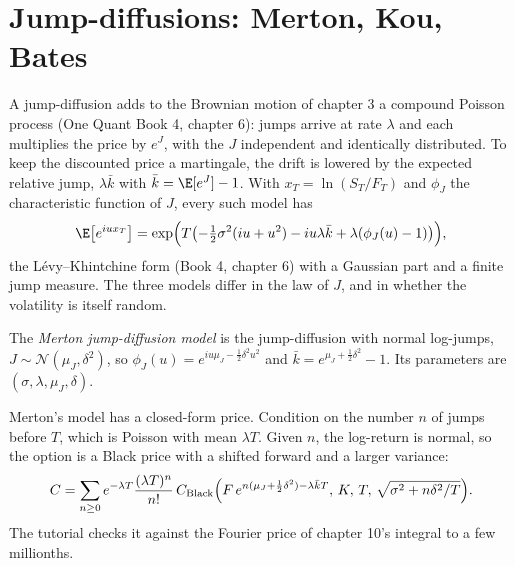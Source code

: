 \begin{omfigure}
\label{fig:dv:jumps-and-levy-models:short}
\end{omfigure}

\section{Jump-diffusions: Merton, Kou, Bates}

A jump-diffusion adds to the Brownian motion of chapter 3 a compound Poisson process (One Quant Book 4,
chapter 6): jumps arrive at rate $\lambda$ and each multiplies the price by $e^{J}$, with the $J$ independent
and identically distributed. To keep the discounted price a martingale, the drift is lowered by the expected
relative jump, $\lambda\bar k$ with $\bar k=\E[e^J]-1$. With $x_T=\ln(S_T/F_T)$ and $\phi_J$ the
characteristic function of $J$, every such model has
\[
\E\bigl[e^{iux_T}\bigr]=\exp\Bigl(T\bigl(-\tfrac12\sigma^2(iu+u^2)-iu\lambda\bar k+\lambda(\phi_J(u)-1)\bigr)\Bigr),
\]
the Lévy--Khintchine form (Book 4, chapter 6) with a Gaussian part and a finite jump measure. The three
models differ in the law of $J$, and in whether the volatility is itself random.

\begin{definition}\label{def:dv:jumps-and-levy-models:merton}
The \emph{Merton jump-diffusion model} is the jump-diffusion with normal
log-jumps, $J\sim\mathcal N(\mu_J,\delta^2)$, so $\phi_J(u)=e^{iu\mu_J-\frac12\delta^2u^2}$ and
$\bar k=e^{\mu_J+\frac12\delta^2}-1$. Its parameters are $(\sigma,\lambda,\mu_J,\delta)$.
\end{definition}

Merton's model has a closed-form price. Condition on the number $n$ of jumps before $T$, which is Poisson with
mean $\lambda T$. Given $n$, the log-return is normal, so the option is a Black price with a shifted forward and
a larger variance:
\[
C=\sum_{n\ge0}e^{-\lambda T}\frac{(\lambda T)^n}{n!}\,C_{\mathrm{Black}}\Bigl(F\,e^{n(\mu_J+\frac12\delta^2)-\lambda\bar kT},\,K,\,T,\,
\sqrt{\sigma^2+n\delta^2/T}\Bigr).
\]
The tutorial checks it against the Fourier price of chapter 10's integral to a few millionths.

